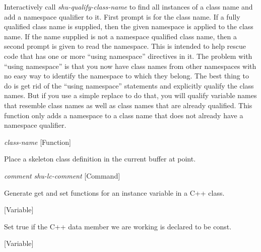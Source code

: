 \begin{doc-string}
Interactively call \emph{shu-qualify-class-name} to find all instances of a class name and
add a namespace qualifier to it.  First prompt is for the class name.  If a fully qualified
class name is supplied, then the given namespace is applied to the class name.  If the name
supplied is not a namespace qualified class name, then a second prompt is given to read the
namespace.
This is intended to help rescue code that has one or more ``using namespace''
directives in it.  The problem with ``using namespace'' is that you now have
class names from other namespaces with no easy way to identify the namespace
to which they belong.  The best thing to do is get rid of the ``using
namespace'' statements and explicitly qualify the class names.  But if you
use a simple replace to do that, you will qualify variable names that resemble
class names as well as class names that are already qualified.  This function
only adds a namespace to a class name that does not already have a namespace
qualifier.
\end{doc-string}

\vspace{1em}
\noindent
{}
\usebox{\funcname}\emph{class-name}
 \hfill [Function]

\begin{doc-string}
Place a skeleton class definition in the current buffer at point.
\end{doc-string}

\vspace{1em}
\noindent
{}
\usebox{\funcname}\emph{comment} \emph{shu-lc-comment}
 \hfill [Command]

\begin{doc-string}
Generate get and set functions for an instance variable in a C++ class.
\end{doc-string}

\vspace{1em}
\noindent
{}
\usebox{\funcname}
 \hfill [Variable]

\begin{doc-string}
Set true if the C++ data member we are working is declared to be const.
\end{doc-string}

\vspace{1em}
\noindent
{}
\usebox{\funcname}
 \hfill [Variable]

